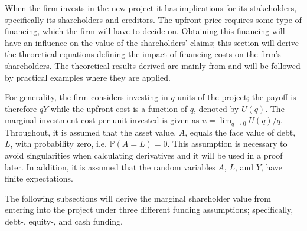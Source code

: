 \documentclass[main.tex]{subfiles}
\begin{document}
    When the firm invests in the new project it has implications for its stakeholders,
    specifically its shareholders and creditors.
    The upfront price requires some type of financing, 
    which the firm will have to decide on.
    Obtaining this financing will have an influence on the value of the shareholders' claims;
    this section will derive the theoretical equations defining
    the impact of financing costs on the firm's shareholders.
    The theoretical results derived are mainly from \textcite{ADS2019} 
    and will be followed by practical examples where they are applied.

    For generality, the firm considers investing in $q$ units of the project; 
    the payoff is therefore $qY$ while the upfront cost is a function of $q$, denoted by $U(q)$. 
    The marginal investment cost per unit invested is given as 
    $u = \lim_{q\rightarrow 0} U(q) / q$.
    Throughout, it is assumed that the asset value, $A$, equals the face value of debt, $L$, 
    with probability zero, i.e. $\mathbb{P}\left(A = L\right) = 0$.
    This assumption is necessary to avoid singularities when calculating derivatives
    and it will be used in a proof later.
    In addition, it is assumed that the random variables
    $A$, $L$, and $Y$, have finite expectations.

    The following subsections will derive the marginal shareholder value from entering into the project
    under three different funding assumptions; specifically, debt-, equity-, and cash funding.
\end{document}
